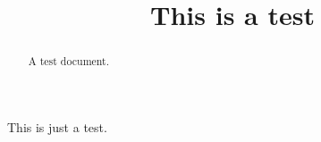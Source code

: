 \documentclass{ximera}
\title{This is a test}
\begin{document}
\begin{abstract}
  A test document.
\end{abstract}
\maketitle


This is just a test.
\end{document}
